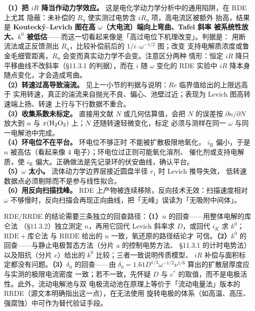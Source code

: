 \begin{pitfall}
\textbf{（1）把 $iR$ 降当作动力学效应。} 这是电化学动力学分析中的通用陷阱，在 RDE 上尤其
隐蔽：未补偿的 $R_{\mathrm{u}}$ 使实测过电势含 $iR_{\mathrm{u}}$ 项，高电流区被额外
抬高，结果是 \textbf{Koutecký--Levich 图在高 $\omega$（大电流）端向上弯曲、Tafel 斜率
被系统性放大、$k^{0}$ 被低估}——而这一切看起来像是「高过电位下机理改变」。判据是：
用断流法或正反馈测出 $R_{\mathrm{u}}$，比较补偿前后的 $1/i$–$\omega^{-1/2}$ 图；改变
支持电解质浓度或鲁金毛细管距离，$R_{\mathrm{u}}$ 会变而真实动力学不会变。注意区分两种
情形：恒定 $iR$ 降只平移曲线不改斜率（\S 11.3.1 的判据），而在 $i$ 随 $\omega$ 变化的
RDE 实验中 $iR$ 降本身随点变化，才会造成弯曲。\\
\textbf{（2）转速过高导致湍流。} 见上一小节的判据与说明：$Re$ 临界值给出的上限远高于
实用转速，真正的湍流来自抛光不良、偏心、池壁过近；表现为 Levich 图高转速端上扬、转速
上行与下行数据不重合。\\
\textbf{（3）收集系数未标定。} 直接用文献 $N$ 或几何估算值，会把 $N$ 的误差按
$\partial n/\partial N$ 放大到 $n$ 与 $x(\ce{H2O2})$ 上；$N$ 还随转速轻微变化，标定
必须与测样在同一 $\omega$ 与同一电解池中完成。\\
\textbf{（4）环电位不在平台。} 环电位不够正时  不能被扩散极限地氧化，
$i_{\mathrm{R}}$ 偏小，于是 $n$ 被高估（看起来像 4 电子）；环电位过正则可能氧化溶剂、
催化剂或支持电解质，使 $i_{\mathrm{R}}$ 偏大。正确做法是先记录环的伏安曲线，确认平台。\\
\textbf{（5）$\omega$ 太小。} 流体动力学边界层接近圆盘半径 $r_1$ 时 Levich 推导失效，
低转速数据点必须剔除而不是参与线性拟合。\\
\textbf{（6）用反向扫描找峰。} RDE 上产物被连续移除，反向技术无效：扫描速度相对
$\omega$ 不够慢时，反向扫描会再现正向曲线，把「无峰」误读为「无吸附中间体」。
\end{pitfall}

\begin{crosscheck}
RDE/RRDE 的结论需要三条独立的回查路径：\textbf{（1）}$n$ 的回查——用整体电解的库仑法
（\S 11.3.2）独立测定 $n$，再用它回代 Levich 斜率求 $D$，或回代 $i_K$ 求 $k^{0}$；
$\mathrm{RDE}+\text{库仑法}$ 与 $\mathrm{RRDE}$ 给出的 $n$ 一致，氧还原的路径结论才
可信。\textbf{（2）}$k^{0}$ 的回查——与静止电极暂态方法（分片 a 的控制电势方法、
\S 11.3.1 的计时电势法）以及阻抗（分片 c）给出的 $k^{0}$ 比较；三者一致说明传质模型、
$iR$ 补偿与面积标定都没有问题。\textbf{（3）}$\delta_0$ 的回查——由
$\delta_0=1.61D^{1/3}\omega^{-1/2}\nu^{1/6}$ 算出的扩散层厚度应与实测的极限电流密度
一致；若不一致，先怀疑 $D$ 与 $c^{*}$ 的取值，而不是电极活性。此外，流动电解池与双
电极流动池在原理上等价于「流动电量法」版本的 RRDE（源文本明确指出这一点），在无法使用
旋转电极的体系（如高温、高压、强腐蚀）中可作为替代验证手段。
\end{crosscheck}

